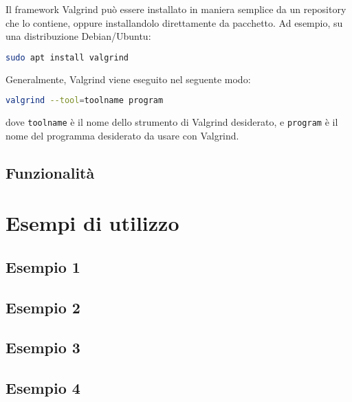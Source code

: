 \documentclass{article}
\begin{document}
Il framework Valgrind può essere installato in maniera semplice da un repository
che lo contiene, oppure installandolo direttamente da pacchetto. Ad esempio, su
una distribuzione Debian/Ubuntu: \\

\begin{lstlisting}[language=bash]
sudo apt install valgrind
\end{lstlisting}

Generalmente, Valgrind viene eseguito nel seguente modo:

\begin{lstlisting}[language=bash]
valgrind --tool=toolname program
\end{lstlisting}
dove \texttt{toolname} è il nome dello strumento di Valgrind desiderato, e
\texttt{program} è il nome del programma desiderato da usare con Valgrind.

\subsection{Funzionalità}
\label{sec:valgrind:funzionalita}


\section{Esempi di utilizzo}

\subsection{Esempio 1}
\label{sec:esempio1}

\subsection{Esempio 2}
\label{sec:esempio2}

\subsection{Esempio 3}
\label{sec:esempio3}

\subsection{Esempio 4}
\label{sec:esempio4}
\end{document}

